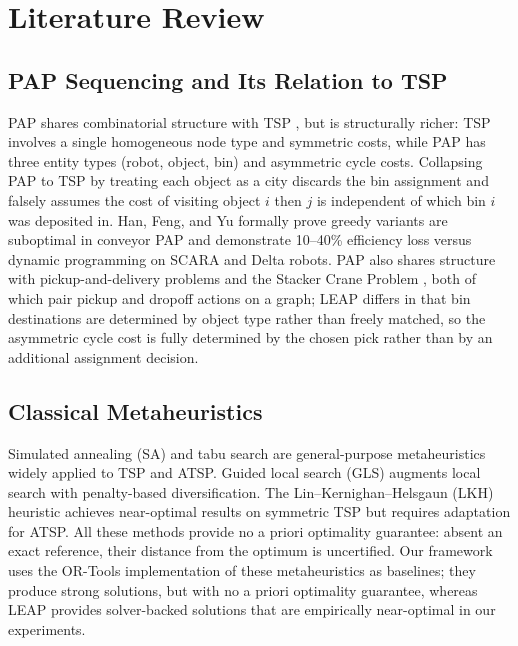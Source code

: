 \documentclass[review,times]{elsarticle}
\begin{document}
\section{Literature Review}\label{sec:lit}

\subsection{PAP Sequencing and Its Relation to TSP}

PAP shares combinatorial structure with TSP \cite{dantzig1954}, but is structurally richer: TSP involves a single homogeneous node type and symmetric costs, while PAP has three entity types (robot, object, bin) and asymmetric cycle costs. Collapsing PAP to TSP by treating each object as a city discards the bin assignment and falsely assumes the cost of visiting object $i$ then $j$ is independent of which bin $i$ was deposited in. Han, Feng, and Yu \cite{han2020pap} formally prove greedy variants are suboptimal in conveyor PAP and demonstrate 10--40\% efficiency loss versus dynamic programming on SCARA and Delta robots. PAP also shares structure with pickup-and-delivery problems \cite{savelsbergh1995pdp} and the Stacker Crane Problem \cite{frederickson1978sc}, both of which pair pickup and dropoff actions on a graph; LEAP differs in that bin destinations are determined by object type rather than freely matched, so the asymmetric cycle cost is fully determined by the chosen pick rather than by an additional assignment decision.

\subsection{Classical Metaheuristics}

Simulated annealing (SA) \cite{kirkpatrick1983sa} and tabu search \cite{glover1989tabu} are general-purpose metaheuristics widely applied to TSP and ATSP. Guided local search (GLS) \cite{voudouris2003gls} augments local search with penalty-based diversification. The Lin--Kernighan--Helsgaun (LKH) heuristic \cite{helsgaun2000lkh} achieves near-optimal results on symmetric TSP but requires adaptation for ATSP. All these methods provide no a priori optimality guarantee: absent an exact reference, their distance from the optimum is uncertified. Our framework uses the OR-Tools implementation \cite{ortools} of these metaheuristics as baselines; they produce strong solutions, but with no a priori optimality guarantee, whereas LEAP provides solver-backed solutions that are empirically near-optimal in our experiments.
\end{document}
